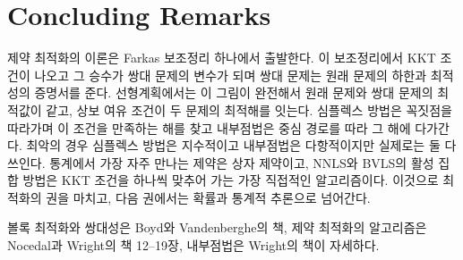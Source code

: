 \section{Concluding Remarks}

제약 최적화의 이론은 Farkas 보조정리 하나에서 출발한다. 이 보조정리에서 KKT 조건이 나오고 그 승수가 쌍대 문제의 변수가 되며 쌍대 문제는 원래 문제의 하한과 최적성의 증명서를 준다. 선형계획에서는 이 그림이 완전해서 원래 문제와 쌍대 문제의 최적값이 같고, 상보 여유 조건이 두 문제의 최적해를 잇는다. 심플렉스 방법은 꼭짓점을 따라가며 이 조건을 만족하는 해를 찾고 내부점법은 중심 경로를 따라 그 해에 다가간다. 최악의 경우 심플렉스 방법은 지수적이고 내부점법은 다항적이지만 실제로는 둘 다 쓰인다. 통계에서 가장 자주 만나는 제약은 상자 제약이고, NNLS와 BVLS의 활성 집합 방법은 KKT 조건을 하나씩 맞추어 가는 가장 직접적인 알고리즘이다. 이것으로 최적화의 권을 마치고, 다음 권에서는 확률과 통계적 추론으로 넘어간다.

볼록 최적화와 쌍대성은 Boyd와 Vandenberghe의 책\cite{boyd2004convex}, 제약 최적화의 알고리즘은 Nocedal과 Wright의 책\cite{nocedal2006} 12--19장, 내부점법은 Wright의 책\cite{wright1997pdipm}이 자세하다.

\chapterreferences
